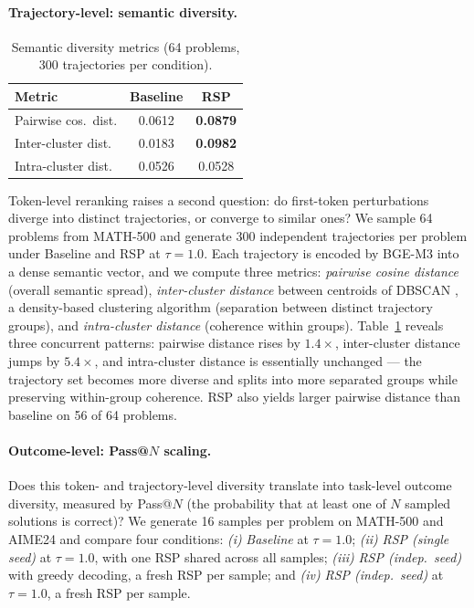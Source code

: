 \paragraph{Trajectory-level: semantic diversity.}
\begin{table}
  \vspace{-1.2em}
  \centering
  \caption{Semantic diversity metrics (64 problems, 300 trajectories per condition).}
  \label{tab:semantic_metrics}
  \footnotesize
  \setlength{\tabcolsep}{4pt}
  \renewcommand{\arraystretch}{0.9}
  \begin{tabular}{lcc}
    \toprule
    \textbf{Metric} & \textbf{Baseline} & \cellcolor{blue!10}\textbf{RSP} \\
    \midrule
    Pairwise cos.\ dist. & 0.0612 & \cellcolor{blue!10}\textbf{0.0879} \\
    Inter-cluster dist. & 0.0183 & \cellcolor{blue!10}\textbf{0.0982} \\
    Intra-cluster dist. & 0.0526 & \cellcolor{blue!10}0.0528 \\
    \bottomrule
  \end{tabular}
\end{table}
Token-level reranking raises a second question: do first-token perturbations diverge into distinct trajectories, or converge to similar ones? We sample 64 problems from MATH-500 and generate 300 independent trajectories per problem under Baseline and RSP at $\tau = 1.0$. Each trajectory is encoded by BGE-M3 \citep{chen2024bge} into a dense semantic vector, and we compute three metrics: \textit{pairwise cosine distance} (overall semantic spread), \textit{inter-cluster distance} between centroids of DBSCAN \citep{ester1996density}, a density-based clustering algorithm (separation between distinct trajectory groups), and \textit{intra-cluster distance} (coherence within groups). Table~\ref{tab:semantic_metrics} reveals three concurrent patterns: pairwise distance rises by $1.4\times$, inter-cluster distance jumps by $5.4\times$, and intra-cluster distance is essentially unchanged --- the trajectory set becomes more diverse and splits into more separated groups while preserving within-group coherence. RSP also yields larger pairwise distance than baseline on 56 of 64 problems.

\paragraph{Outcome-level: Pass@$N$ scaling.}
Does this token- and trajectory-level diversity translate into task-level outcome diversity, measured by Pass@$N$ \citep{chen2021codex} (the probability that at least one of $N$ sampled solutions is correct)? We generate 16 samples per problem on MATH-500 and AIME24 and compare four conditions: \textit{(i)} \textit{Baseline} at $\tau\!=\!1.0$; \textit{(ii)} \textit{RSP (single seed)} at $\tau\!=\!1.0$, with one RSP shared across all samples; \textit{(iii)} \textit{RSP (indep.\ seed)} with greedy decoding, a fresh RSP per sample; and \textit{(iv)} \textit{RSP (indep.\ seed)} at $\tau\!=\!1.0$, a fresh RSP per sample.

